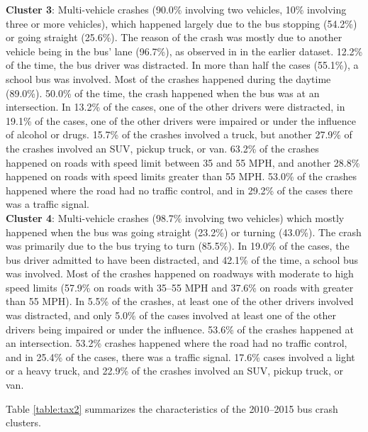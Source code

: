 \noindent
\textbf{Cluster 3}:  Multi-vehicle crashes (90.0\% involving two vehicles, 10\% involving three or more vehicles), which happened largely due to the bus stopping (54.2\%) or going straight (25.6\%). The reason of the crash was mostly due to another vehicle being in the bus' lane (96.7\%), as observed in in the earlier dataset. 12.2\% of the time, the bus driver was distracted. In more than half the cases (55.1\%), a school bus was involved. Most of the crashes happened during the daytime (89.0\%). 50.0\% of the time, the crash happened when the bus was at an intersection. In 13.2\% of the cases, one of the other drivers were distracted, in 19.1\% of the cases, one of the other drivers were impaired or under the influence of alcohol or drugs. 15.7\% of the crashes involved a truck, but another 27.9\% of the crashes involved an SUV, pickup truck, or van. 63.2\% of the crashes happened on roads with speed limit between 35 and 55 MPH, and another 28.8\% happened on roads with speed limits greater than 55 MPH.  53.0\% of the crashes happened where the road had no traffic control, and in 29.2\% of the cases there was a traffic signal.\\
\noindent
\textbf{Cluster 4}: Multi-vehicle crashes (98.7\% involving two vehicles) which mostly happened when the bus was going straight (23.2\%) or turning (43.0\%). The crash was primarily due to the bus trying to turn (85.5\%). In 19.0\% of the cases, the bus driver admitted to have been distracted, and 42.1\% of the time, a school bus was involved. Most of the crashes happened on roadways with moderate to high speed limits (57.9\% on roads with 35--55 MPH and 37.6\% on roads with greater than 55 MPH). In 5.5\% of the crashes, at least one of the other drivers involved was distracted, and only 5.0\% of the cases involved at least one of the other drivers being impaired or under the influence. 53.6\% of the crashes happened at an intersection. 53.2\% crashes happened where the road had no traffic control, and in 25.4\% of the cases, there was a traffic signal. 17.6\% cases involved a light or a heavy truck, and 22.9\% of the crashes involved an SUV, pickup truck, or van.\par
\noindent
Table \ref{table:tax2} summarizes the characteristics of the 2010--2015 bus crash clusters.\par 
